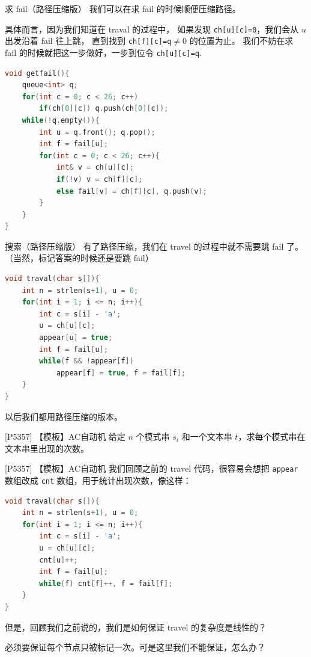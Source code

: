 \documentclass{beamer}
\begin{document}
\begin{frame}[fragile]{求 fail（路径压缩版）}
    \small
    我们可以在求 fail 的时候顺便压缩路径。

    \vspace{1em}\pause
    具体而言，因为我们知道在 traval 的过程中，
    如果发现 \verb|ch[u][c]=0|，我们会从 $u$ 出发沿着 fail 往上跳，
    直到找到 \verb|ch[f][c]=q|$\neq 0$ 的位置为止。
    我们不妨在求 fail 的时候就把这一步做好，一步到位令 \verb|ch[u][c]=q|.

    \pause
    \begin{lstlisting}[language=c++]
void getfail(){
    queue<int> q;
    for(int c = 0; c < 26; c++)
        if(ch[0][c]) q.push(ch[0][c]);
    while(!q.empty()){
        int u = q.front(); q.pop();
        int f = fail[u];
        for(int c = 0; c < 26; c++){
            int& v = ch[u][c];
            if(!v) v = ch[f][c];
            else fail[v] = ch[f][c], q.push(v);
        }
    }
}
    \end{lstlisting}
\end{frame}

\begin{frame}[fragile]{搜索（路径压缩版）}
    \small
    有了路径压缩，我们在 travel 的过程中就不需要跳 fail 了。
    （当然，标记答案的时候还是要跳 fail）

    \begin{lstlisting}[language=c++]
void traval(char s[]){
    int n = strlen(s+1), u = 0;
    for(int i = 1; i <= n; i++){
        int c = s[i] - 'a';
        u = ch[u][c];
        appear[u] = true;
        int f = fail[u];
        while(f && !appear[f])
            appear[f] = true, f = fail[f];
    }
}
    \end{lstlisting}

    以后我们都用路径压缩的版本。
\end{frame}

\begin{frame}[fragile]{[P5357] 【模板】AC自动机}
    \small
    给定 $n$ 个模式串 $s_i$ 和一个文本串 $t$，求每个模式串在文本串里出现的次数。  
\end{frame}

\begin{frame}[fragile]{[P5357] 【模板】AC自动机}
    \footnotesize
    我们回顾之前的 travel 代码，很容易会想把 \verb|appear| 数组改成
    \verb|cnt| 数组，用于统计出现次数，像这样：

    \begin{lstlisting}[language=c++]
void traval(char s[]){
    int n = strlen(s+1), u = 0;
    for(int i = 1; i <= n; i++){
        int c = s[i] - 'a';
        u = ch[u][c];
        cnt[u]++;
        int f = fail[u];
        while(f) cnt[f]++, f = fail[f];
    }
}
    \end{lstlisting}
    \pause

    但是，回顾我们之前说的，我们是如何保证 travel 的复杂度是线性的？

    \vspace{.7em}\pause
    必须要保证每个节点只被标记一次。可是这里我们不能保证，怎么办？
\end{frame}
\end{document}
